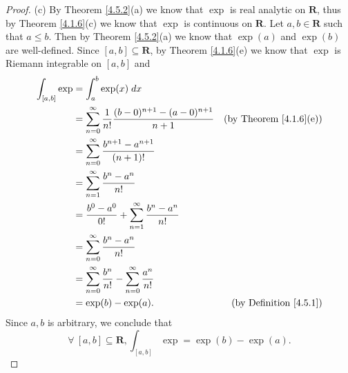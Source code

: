 \begin{proof}{(c)}
    By Theorem \ref{4.5.2}(a) we know that \(\exp\) is real analytic on \(\mathbf{R}\), thus by Theorem \ref{4.1.6}(c) we know that \(\exp\) is continuous on \(\mathbf{R}\).
    Let \(a, b \in \mathbf{R}\) such that \(a \leq b\).
    Then by Theorem \ref{4.5.2}(a) we know that \(\exp(a)\) and \(\exp(b)\) are well-defined.
    Since \([a, b] \subseteq \mathbf{R}\), by Theorem \ref{4.1.6}(e) we know that \(\exp\) is Riemann integrable on \([a, b]\) and
    \begin{align*}
        \int_{[a, b]} \exp & = \int_a^b \exp(x) \; dx                                                                                                \\
                           & = \sum_{n = 0}^\infty \frac{1}{n!} \frac{(b - 0)^{n + 1} - (a - 0)^{n + 1}}{n + 1} & \text{(by Theorem \ref{4.1.6}(e))} \\
                           & = \sum_{n = 0}^\infty \frac{b^{n + 1} - a^{n + 1}}{(n + 1)!}                                                            \\
                           & = \sum_{n = 1}^\infty \frac{b^n - a^n}{n!}                                                                              \\
                           & = \frac{b^0 - a^0}{0!} + \sum_{n = 1}^\infty \frac{b^n - a^n}{n!}                                                       \\
                           & = \sum_{n = 0}^\infty \frac{b^n - a^n}{n!}                                                                              \\
                           & = \sum_{n = 0}^\infty \frac{b^n}{n!} - \sum_{n = 0}^\infty \frac{a^n}{n!}                                               \\
                           & = \exp(b) - \exp(a).                                                               & \text{(by Definition \ref{4.5.1})}
    \end{align*}
    Since \(a, b\) is arbitrary, we conclude that
    \[
        \forall\ [a, b] \subseteq \mathbf{R}, \int_{[a, b]} \exp = \exp(b) - \exp(a).
    \]
\end{proof}

